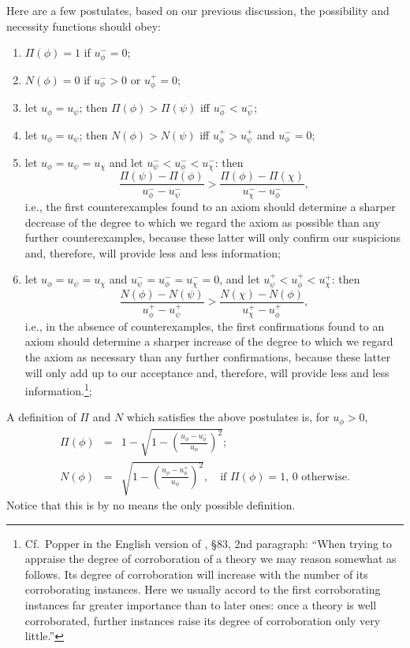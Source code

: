\documentclass[a4paper]{article}
\newcounter{ex}
\begin{document}
Here are a few postulates, based on our previous discussion, the possibility
and necessity functions should obey:
\begin{enumerate}
\item $\Pi(\phi) = 1$ if $u_\phi^- = 0$;
\item $N(\phi) = 0$ if $u_\phi^- > 0$ or $u_\phi^+ = 0$;
\item let $u_\phi = u_\psi$; then $\Pi(\phi) > \Pi(\psi)$ iff $u_\phi^- < u_\psi^-$;
\item let $u_\phi = u_\psi$; then $N(\phi) > N(\psi)$ iff $u_\phi^+ > u_\psi^+$ and $u_\phi^- = 0$;
\item let $u_\phi = u_\psi = u_\chi$ and let $u_\psi^- < u_\phi^- < u_\chi^-$: then
  \[
    \frac{\Pi(\psi) - \Pi(\phi)}{u_\phi^- - u_\psi^-} > \frac{\Pi(\phi) - \Pi(\chi)}{u_\chi^- - u_\phi^-},
  \]
  i.e., the first counterexamples found to an axiom should determine a sharper decrease
  of the degree to which we regard the axiom as possible than any further counterexamples,
  because these latter will only confirm our suspicions and, therefore, will provide
  less and less information;
\item let $u_\phi = u_\psi = u_\chi$ and $u_\psi^- = u_\phi^- = u_\chi^- = 0$,
  and let $u_\psi^+ < u_\phi^+ < u_\chi^+$: then
  \[
    \frac{N(\phi) - N(\psi)}{u_\phi^+ - u_\psi^+} > \frac{N(\chi) - N(\phi)}{u_\chi^+ - u_\phi^+},
  \]
  i.e., in the absence of counterexamples,
  the first confirmations found to an axiom should determine a sharper increase
  of the degree to which we regard the axiom as necessary than any further confirmations,
  because these latter will only add up to our acceptance and, therefore, will provide
  less and less information.\footnote{Cf.\ Popper in the English version of
  \cite{Popper1935}, \S83, 2nd paragraph:
  ``When trying to appraise the degree of corroboration of a theory
    we may reason somewhat as follows. Its degree of corroboration
    will increase with the number of its corroborating instances.
    Here we usually accord to the first corroborating instances far greater
    importance than to later ones: once a theory is well corroborated,
    further instances raise its degree of corroboration only very little.''};
\end{enumerate}

A definition of $\Pi$ and $N$ which satisfies the above postulates is, for $u_\phi > 0$,
\begin{eqnarray}
  \Pi(\phi) &=& 1 - \sqrt{1 - \left(\frac{u_\phi - u_\phi^-}{u_\phi}\right)^2}; \\
  N(\phi) &=& \sqrt{1 - \left(\frac{u_\phi - u_\phi^+}{u_\phi}\right)^2},\quad
    \mbox{if $\Pi(\phi) = 1$, 0 otherwise.}
\end{eqnarray}
Notice that this is by no means the only possible definition.
\end{document}
